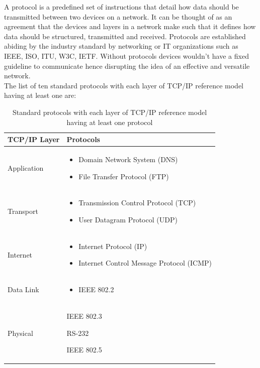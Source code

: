 \documentclass{lab_sheet}
\begin{document}
A protocol is a predefined set of instructions that detail how data should be transmitted between two devices on a network. It can be thought of as an agreement that the devices and layers in a network make such that it defines how data should be structured, transmitted and received. Protocols are established abiding by the industry standard by networking or IT organizations such as IEEE, ISO, ITU, W3C, IETF.  Without protocols devices wouldn't have a fixed guideline to communicate hence disrupting the idea of an effective and versatile network.\\
The list of ten standard protocols with each layer of TCP/IP reference model having at least one are:
\begin{table}[H]
    \centering
    \begin{tabular}{|C{4cm}|C{7.5cm}|}
        \hline
        \textbf{TCP/IP Layer} & \textbf{Protocols}         \\ \hline
        Application           & \begin{itemize}
            \item Domain Network System (DNS)
            \item File Transfer Protocol (FTP)
        \end{itemize}  \\ \hline
        Transport             & \begin{itemize}
            \item Transmission Control Protocol (TCP)
            \item User Datagram Protocol (UDP)
        \end{itemize}  \\ \hline
        Internet              & \begin{itemize}
            \item Internet Protocol (IP)
            \item Internet Control Message Protocol (ICMP)
        \end{itemize} \\ \hline
        Data Link             & \begin{itemize}
            \item IEEE 802.2
        \end{itemize} \\ \hline
        Physical              & \begin{itemize*}
            \item IEEE 802.3
            \item RS-232
            \item IEEE 802.5
        \end{itemize*} \\ \hline
    \end{tabular}
    \caption{Standard protocols with each layer of TCP/IP reference model having at least one protocol}
\end{table}
\end{document}
